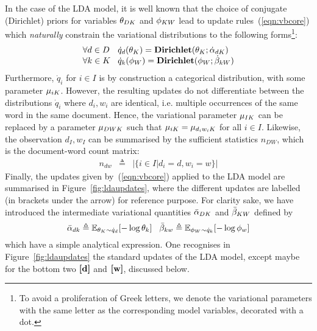 In the case of the LDA model, it is well known that the choice of conjugate (Dirichlet) priors for variables $\theta_{DK}$ and $\phi_{KW}$ lead to update rules~(\ref{eqn:vbcore}) which {\em naturally} constrain the variational distributions to the following forms\footnote{To avoid a proliferation of Greek letters, we denote the variational parameters with the same letter as the corresponding model variables, decorated with a dot.}:
\[
\begin{array}{l@{\hspace{.3cm}}l}
\forall d\in D& \dot{q}_d(\vmDK_K) = \mathbf{Dirichlet}(\vmDK_K;\vvmDK_{dK}) \\
\forall k\in K& \dot{q}_k(\vmKW_W) = \mathbf{Dirichlet}(\vmKW_W;\vvmKW_{kW})
\end{array}
\]
Furthermore, $\dot{q}_i$ for $i\in I$ is by construction a categorical distribution, with some parameter $\mu_{iK}$. However, the resulting updates do not differentiate between the distributions $\dot{q}_i$ where $d_i,w_i$ are identical, i.e. multiple occurrences of the same word in the same document. Hence, the variational parameter $\mu_{IK}$ can be replaced by a parameter $\mu_{DWK}$ such that $\mu_{iK}=\mu_{d_iw_iK}$ for all $i\in I$. Likewise, the observation $d_I,w_I$ can be summarised by the sufficient statistics $n_{DW}$, which is the document-word count matrix:
\begin{eqnarray*}
n_{dw} & \triangleq & |\{i\in I|d_i=d,w_i=w\}|
\end{eqnarray*}
Finally, the updates given by~(\ref{eqn:vbcore}) applied to the LDA model are summarised in Figure~\ref{fig:ldaupdates}, where the different updates are labelled (in brackets under the arrow) for reference purpose. For clarity sake, we have introduced the intermediate variational quantities $\bar{\alpha}_{DK}$ and $\bar{\beta}_{KW}$ defined by
\[
\bar{\alpha}_{dk}\triangleq\mathbb{E}_{\theta_K\sim\dot{q}_d}[-\log\theta_k]
\hspace{.3cm}
\bar{\beta}_{kw}\triangleq\mathbb{E}_{\phi_W\sim\dot{q}_k}[-\log\phi_w]
\]
which have a simple analytical expression. One recognises in Figure~\ref{fig:ldaupdates} the standard updates of the LDA model, except maybe for the bottom two $\textbf{[d]}$ and $\textbf{[w]}$, discussed below.

